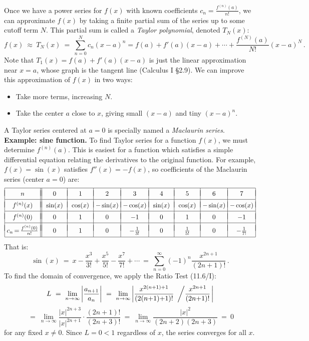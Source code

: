 \documentclass[11pt]{article}
\begin{document}
Once we have a power series for $f(x)$ with known coefficients $c_n = \frac{f^{(n)}(a)}{n!}$, 
we can approximate $f(x)$ by taking a finite partial sum of the series up to some cutoff term $N$. 
This partial sum is called a {\it Taylor polynomial}, denoted $T_N(x)$:
$$
f(x)\ \approx\ T_N(x) \ =\ \sum_{n=0}^N c_n(x{-}a)^n = f(a) + f'(a)(x{-}a)  + \cdots + \frac{f^{(N)}(a)}{N!}(x{-}a)^N\,.
$$
Note that $T_1(x) = f(a)+f'(a)(x-a)$ is just the linear approximation near $x=a$, whose graph is the tangent line (Calculus I \S2.9).
We can improve this approximation of $f(x)$ in two ways:
\begin{itemize}
\item Take more terms, increasing $N$.
\item Take  the center $a$ close to $x$, giving small $(x{-}a)$ and tiny $(x{-}a)^n$.
\end{itemize}
%
A Taylor series centered at $a=0$ is specially named a {\it Maclaurin series}.
\\[1em]
{\bf Example: sine function.} To find Taylor series for a function $f(x)$, we must determine
$f^{(n)}(a)$. This is easiest for a function which satisfies a simple differential equation
relating the derivatives to the original function. For example, $f(x)=\sin(x)$ satisfies 
$f''(x) = -f(x)$, so coefficients of the Maclaurin series (center $a=0$) are:
$$\begin{array}{|c||c|c|c|c|c|c|c|c|c|}
\hline &&&&&&&& \\[-.9em] 
n & 0 & 1 & 2  & 3 & 4 & 5 & 6 & 7 
\\[.2em] \hline &&&&&&&& \\[-.9em]
f^{(n)}(x) & \,\sin(x)\, &\,\cos(x)\, & \!-\sin(x)\! & \!-\cos(x)\! & \,\sin(x)\, &\,\cos(x)\, &\! -\sin(x)\!& \!-\cos(x) \!
\\[.2em] \hline &&&&&&&& \\[-.9em] 
f^{(n)}(0) & 0 &1 & 0 & -1 & 0 &1 & 0 & -1 
\\[.2em] \hline &&&&&&&&\\[-.9em] 
\!c_n\,{=}\,\frac{f^{(n)}(0)}{n!}\! & 0 & 1 & 0 & -\frac1{3!} & 0 &\frac1{5!} & 0 &-\frac1{7!}
\\[.3em] \hline
\end{array}$$
That is:
$$
\sin(x) \ =\  x - \frac{x^3}{3!} +\frac{x^5}{5!}- \frac{x^7}{7!}+\cdots 
\ =\ \sum_{n=0}^\infty (-1)^n \frac{x^{2n+1}}{(2n{+}1)!}\,. 
$$
To find the domain of convergence, we apply the Ratio Test (11.6/I):
$$
L 
\ = \ \lim_{n\to\infty}\left|\frac{a_{n+1}}{a_n}\right|
\ = \ \lim_{n\to\infty}\left|\frac{x^{2(n+1)+1}}{(2(n{+}1){+}1)!}\ \left/ \frac{x^{2n+1}}{(2n{+}1)!}\right.\right|
$$ 
$$
\ = \ \lim_{n\to\infty}\frac{|x|^{2n+3}}{|x|^{2n+1}}\cdot\frac{(2n{+}1)!}{(2n{+}3)!}
\ = \ \lim_{n\to\infty}\frac{|x|^2}{(2n{+}2)(2n{+}3)}
\ =\ 0
$$ 
for any fixed $x\neq 0$. Since $L=0<1$ regardless of $x$, the series converges for all $x$.
\end{document}
